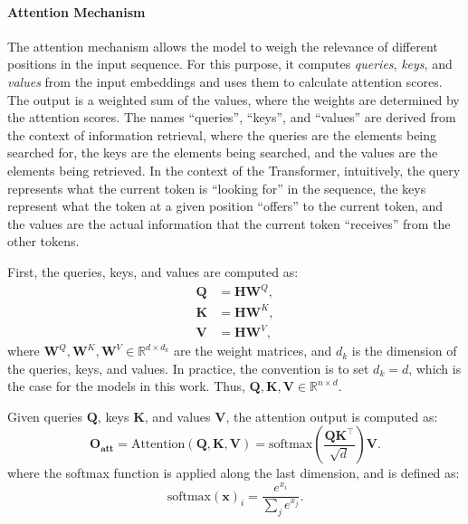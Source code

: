 \paragraph{Attention Mechanism}

The attention mechanism \parencite{bahdanau_neural_2014} allows the model to weigh the relevance of different positions in the input sequence. For this purpose, it computes \emph{queries}, \emph{keys}, and \emph{values} from the input embeddings and uses them to calculate attention scores. The output is a weighted sum of the values, where the weights are determined by the attention scores. The names ``queries'', ``keys'', and ``values'' are derived from the context of information retrieval, where the queries are the elements being searched for, the keys are the elements being searched, and the values are the elements being retrieved. In the context of the Transformer, intuitively, the query represents what the current token is ``looking for'' in the sequence, the keys represent what the token at a given position ``offers'' to the current token, and the values are the actual information that the current token ``receives'' from the other tokens.

First, the queries, keys, and values are computed as:
\begin{align*}
    \mathbf{Q} & = \mathbf{H} \mathbf{W}^Q, \\
    \mathbf{K} & = \mathbf{H} \mathbf{W}^K, \\
    \mathbf{V} & = \mathbf{H} \mathbf{W}^V,
\end{align*}
where $\mathbf{W}^Q, \mathbf{W}^K, \mathbf{W}^V \in \mathbb{R}^{d \times d_k}$ are the weight matrices, and $d_k$ is the dimension of the queries, keys, and values. In practice, the convention is to set $d_k = d$, which is the case for the models in this work. Thus, $\mathbf{Q}, \mathbf{K}, \mathbf{V} \in \mathbb{R}^{n \times d}$.

Given queries $\mathbf{Q}$, keys $\mathbf{K}$, and values $\mathbf{V}$, the attention output is computed as:
\begin{equation*}
    \mathbf{O_{att}} = \text{Attention}(\mathbf{Q}, \mathbf{K}, \mathbf{V}) = \text{softmax}\left( \frac{\mathbf{Q} \mathbf{K}^\top}{\sqrt{d}} \right) \mathbf{V}.
\end{equation*}
where the softmax function is applied along the last dimension, and is defined as:
\begin{equation*}
    \text{softmax}(\mathbf{x})_i = \frac{e^{x_i}}{\sum_j e^{x_j}}.
\end{equation*}

